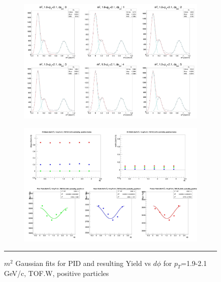 \begin{figure}[H]
  \centering
    \begin{subfigure}[p]{1\textwidth}
    \includegraphics[width=1\textwidth]{lowptfits/yieldvsdphi_tof1_cent0_ch1_pT-19-21.jpg}
    \end{subfigure}
    \begin{subfigure}[p]{1\textwidth}
    \includegraphics[width=1\textwidth]{lowptfits/fitParams_tof1_cent0_ch1_pT-19-21.jpg}
    \end{subfigure}
    \rule{35em}{0.5pt}
  \caption[PID fits and Yield vs $d\phi$ for $p_T$=1.9-2.1 GeV/c, TOF.W, positive particles ]{$m^2$ Gaussian fits for PID and resulting Yield vs $d\phi$ for $p_T$=1.9-2.1 GeV/c, TOF.W, positive particles}
  \label{fig:fits19-21pos}
\end{figure}
\restoregeometry

